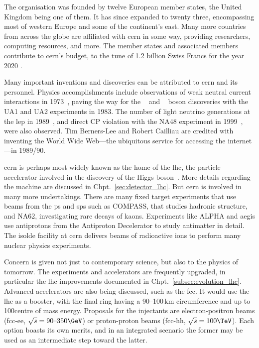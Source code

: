 The organisation was founded by twelve European member states, the United Kingdom being one of them. It has since expanded to twenty three, encompassing most of western Europe and some of the continent's east. Many more countries from across the globe are affiliated with \acrshort{cern} in some way, providing researchers, computing resources, and more. The member states and associated members contribute to \acrshort{cern}'s budget, to the tune of 1.2 billion Swiss Francs for the year 2020 \cite{cern_budget_2020}.

Many important inventions and discoveries can be attributed to \acrshort{cern} and its personnel. Physics accomplishments include observations of weak neutral current interactions in 1973~\cite{HASERT1973121,HASERT1973138}, paving the way for the \PW~\cite{ARNISON1983103,BANNER1983476} and \PZ~\cite{Arnison:1983mk,Bagnaia:1983zx} boson discoveries with the UA1 and UA2 experiments in 1983. The number of light neutrino generations at the \acrfull{lep} in 1989~\cite{Trentadue:200667}, and direct CP violation with the NA48 experiment in 1999~\cite{Fanti_1999}, were also observed. Tim Berners-Lee and Robert Cailliau are credited with inventing the World Wide Web---the ubiquitous service for accessing the internet---in 1989/90.

\acrshort{cern} is perhaps most widely known as the home of the \acrlong{lhc}, the particle accelerator involved in the discovery of the Higgs boson~\cite{Chatrchyan:2012xdj,Aad:2012tfa}. More details regarding the machine are discussed in Chpt.~\ref{sec:detector_lhc}. But \acrshort{cern} is involved in many more undertakings. There are many fixed target experiments that use beams from the \acrshort{ps} and \acrshort{sps} such as COMPASS, that studies hadronic structure, and NA62, investigating rare decays of kaons. Experiments like ALPHA and \acrshort{aegis} use antiprotons from the Antiproton Decelerator to study antimatter in detail. The \acrshort{isolde} facility at \acrshort{cern} delivers beams of radioactive ions to perform many nuclear physics experiments.

Concern is given not just to contemporary science, but also to the physics of tomorrow. The experiments and accelerators are frequently upgraded, in particular the \acrshort{lhc} improvements documented in Chpt.~\ref{subsec:evolution_lhc}. Advanced accelerators are also being discussed, such as the \acrfull{fcc}. It would use the \acrshort{lhc} as a booster, with the final ring having a 90--100\,km circumference and up to 100\TeV centre of mass energy. Proposals for the injectants are electron-positron beams (\acrshort{fcc}-ee, $\sqrt{s} = \text{90--350}\GeV$) or proton-proton beams (\acrshort{fcc}-hh, $\sqrt{s} = \text{100}\TeV$). Each option boasts its own merits, and in an integrated scenario the former may be used as an intermediate step toward the latter.


